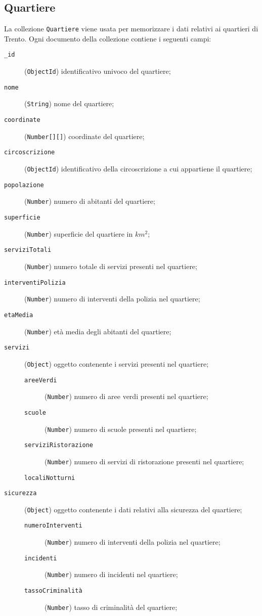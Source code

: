     \subsection{Quartiere}
        La collezione \texttt{Quartiere} viene usata per memorizzare i dati relativi ai quartieri di Trento. Ogni documento della collezione contiene i seguenti campi:
        \begin{description}
            \item[\texttt{\_id}] (\texttt{ObjectId}) identificativo univoco del quartiere;
            \item[\texttt{nome}] (\texttt{String}) nome del quartiere;
            \item[\texttt{coordinate}] (\texttt{Number[][]}) coordinate del quartiere;
            \item[\texttt{circoscrizione}] (\texttt{ObjectId}) identificativo della circoscrizione a cui appartiene il quartiere;
            \item[\texttt{popolazione}] (\texttt{Number}) numero di abitanti del quartiere;
            \item[\texttt{superficie}] (\texttt{Number}) superficie del quartiere in $km^2$;
            \item[\texttt{serviziTotali}] (\texttt{Number}) numero totale di servizi presenti nel quartiere;
            \item[\texttt{interventiPolizia}] (\texttt{Number}) numero di interventi della polizia nel quartiere;
            \item[\texttt{etaMedia}] (\texttt{Number}) età media degli abitanti del quartiere;
            \item[\texttt{servizi}] (\texttt{Object}) oggetto contenente i servizi presenti nel quartiere;
                \begin{description}
                    \item[\texttt{areeVerdi}] (\texttt{Number}) numero di aree verdi presenti nel quartiere;
                    \item[\texttt{scuole}] (\texttt{Number}) numero di scuole presenti nel quartiere;
                    \item[\texttt{serviziRistorazione}] (\texttt{Number}) numero di servizi di ristorazione presenti nel quartiere;
                    \item[\texttt{localiNotturni}]
                \end{description}
            \item[\texttt{sicurezza}] (\texttt{Object}) oggetto contenente i dati relativi alla sicurezza del quartiere;
                \begin{description}
                    \item[\texttt{numeroInterventi}] (\texttt{Number}) numero di interventi della polizia nel quartiere;
                    \item[\texttt{incidenti}] (\texttt{Number}) numero di incidenti nel quartiere;
                    \item[\texttt{tassoCriminalità}] (\texttt{Number}) tasso di criminalità del quartiere;
                \end{description}
        \end{description}
